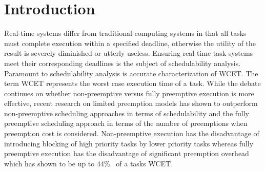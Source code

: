 \vspace{-15pt}
\section{Introduction}\label{sec:introduction}

Real-time systems differ from traditional computing systems in that all tasks must complete execution within a specified deadline, otherwise the utility of the result is severely diminished or utterly useless.  Ensuring real-time task systems meet their corresponding deadlines is the subject of schedulability analysis.  Paramount to schedulability analysis is accurate characterization of WCET.  The term WCET represents the worst case execution time of a task.  While the debate continues on whether non-preemptive versus fully preemptive execution is more effective, recent research on limited preemption models has shown to outperform non-preemptive scheduling approaches in terms of schedulability and the fully preemptive scheduling approach in terms of the number of preemptions when preemption cost is considered.  Non-preemptive execution has the disadvantage of introducing blocking of high priority tasks by lower priority tasks whereas fully preemptive execution has the disadvantage of significant preemption overhead which has shown to be up to 44\%~\cite{pellizzoni:07,pellizzoni:08,pellizzoni:11} of a tasks WCET.

